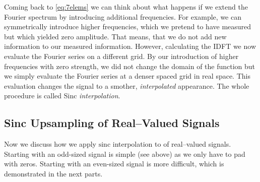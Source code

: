 \documentclass{juliacon}
\def\sinc{\mathrm{sinc}}
\begin{document}
    
    Coming back to \autoref{eq:7elems} we can think about what happens if we extend the Fourier spectrum by introducing additional frequencies. 
    For example, we can symmetrically introduce higher frequencies, which we pretend to have measured but which yielded zero amplitude. That means, that we do not add new information to our measured information.
    However, calculating the IDFT we now evaluate the Fourier series on a different grid.
    By our introduction of higher frequencies with zero strength, we did not change the domain of the function but we simply evaluate the Fourier series at a denser spaced grid in real space. This evaluation changes the signal to a smother, \textit{interpolated} appearance.
    The whole procedure is called Sinc \textit{interpolation}.\\
    
    \subsection{Sinc Upsampling of Real--Valued Signals}
        Now we discuss how we apply $\sinc$ interpolation to of real--valued signals.
        Starting with an odd-sized signal is simple (see above) as we only have to pad with zeros.
        Starting with an even-sized signal is more difficult, which is demonstrated in the next parts.
        
\end{document}
